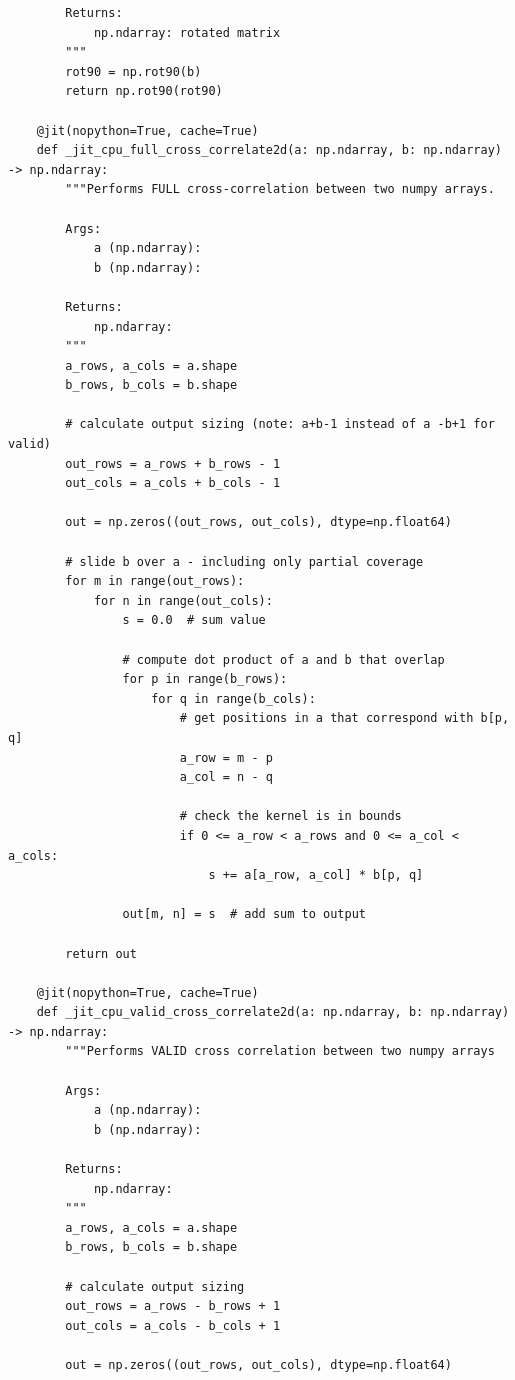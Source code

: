 \documentclass{article}
\begin{document}
\begin{verbatim}
        Returns:
            np.ndarray: rotated matrix
        """
        rot90 = np.rot90(b)
        return np.rot90(rot90)

    @jit(nopython=True, cache=True)
    def _jit_cpu_full_cross_correlate2d(a: np.ndarray, b: np.ndarray) -> np.ndarray:
        """Performs FULL cross-correlation between two numpy arrays.

        Args:
            a (np.ndarray):
            b (np.ndarray):

        Returns:
            np.ndarray:
        """
        a_rows, a_cols = a.shape
        b_rows, b_cols = b.shape

        # calculate output sizing (note: a+b-1 instead of a -b+1 for valid)
        out_rows = a_rows + b_rows - 1
        out_cols = a_cols + b_cols - 1

        out = np.zeros((out_rows, out_cols), dtype=np.float64)

        # slide b over a - including only partial coverage
        for m in range(out_rows):
            for n in range(out_cols):
                s = 0.0  # sum value

                # compute dot product of a and b that overlap
                for p in range(b_rows):
                    for q in range(b_cols):
                        # get positions in a that correspond with b[p, q]
                        a_row = m - p
                        a_col = n - q

                        # check the kernel is in bounds
                        if 0 <= a_row < a_rows and 0 <= a_col < a_cols:
                            s += a[a_row, a_col] * b[p, q]

                out[m, n] = s  # add sum to output

        return out

    @jit(nopython=True, cache=True)
    def _jit_cpu_valid_cross_correlate2d(a: np.ndarray, b: np.ndarray) -> np.ndarray:
        """Performs VALID cross correlation between two numpy arrays

        Args:
            a (np.ndarray):
            b (np.ndarray):

        Returns:
            np.ndarray:
        """
        a_rows, a_cols = a.shape
        b_rows, b_cols = b.shape

        # calculate output sizing
        out_rows = a_rows - b_rows + 1
        out_cols = a_cols - b_cols + 1

        out = np.zeros((out_rows, out_cols), dtype=np.float64)


\end{verbatim}
\end{document}
